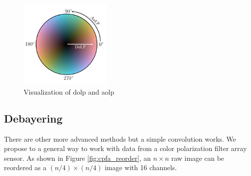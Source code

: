 \begin{figure}[H]
    \centering
    \includegraphics[width=0.4\textwidth]{figures/cmap/aolp_dolp_cmap.pdf}
    \caption{Visualization of \gls{dolp} and \gls{aolp}}
\end{figure}

\subsection*{Debayering}
There are other more advanced methods but a simple convolution works.
We propose to a general way to work with data from a color polarization filter array sensor.
As shown in Figure \ref{fig:cpfa_reorder}, an $n \times n$ raw image can be reordered as a $(n/4) \times (n/4) $ image with 16 channels.





